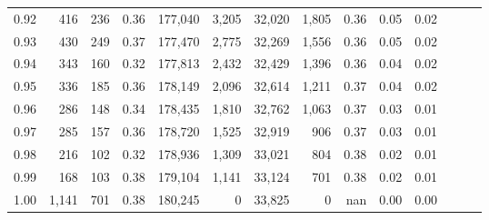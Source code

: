 \begin{tabular}{rrrrrrrrrrrrrr}
0.92 &    416 &  236 &  0.36 &  177,040 &    3,205 &  32,020 &   1,805 &  0.36 &  0.05 &      0.02 \\
0.93 &    430 &  249 &  0.37 &  177,470 &    2,775 &  32,269 &   1,556 &  0.36 &  0.05 &      0.02 \\
0.94 &    343 &  160 &  0.32 &  177,813 &    2,432 &  32,429 &   1,396 &  0.36 &  0.04 &      0.02 \\
0.95 &    336 &  185 &  0.36 &  178,149 &    2,096 &  32,614 &   1,211 &  0.37 &  0.04 &      0.02 \\
0.96 &    286 &  148 &  0.34 &  178,435 &    1,810 &  32,762 &   1,063 &  0.37 &  0.03 &      0.01 \\
0.97 &    285 &  157 &  0.36 &  178,720 &    1,525 &  32,919 &     906 &  0.37 &  0.03 &      0.01 \\
0.98 &    216 &  102 &  0.32 &  178,936 &    1,309 &  33,021 &     804 &  0.38 &  0.02 &      0.01 \\
0.99 &    168 &  103 &  0.38 &  179,104 &    1,141 &  33,124 &     701 &  0.38 &  0.02 &      0.01 \\
1.00 &  1,141 &  701 &  0.38 &  180,245 &        0 &  33,825 &       0 &   nan &  0.00 &      0.00 \\
\bottomrule
\end{tabular}
